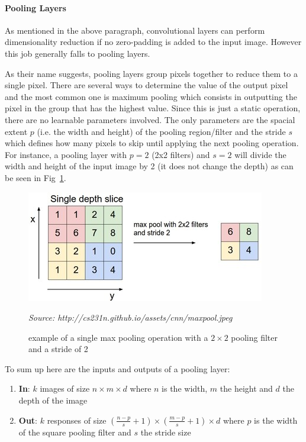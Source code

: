 \documentclass[12pt,twoside]{article}
\newcommand{\source}[1]{\vspace{-3pt} \caption*{ \footnotesize{\textit{Source: {#1}}}} }
\begin{document}
\paragraph{Pooling Layers}  

As mentioned in the above paragraph, convolutional layers can perform
dimensionality reduction if no zero-padding is added to the input image.
However this job generally falls to pooling layers.

As their name suggests, pooling layers group pixels together to reduce them to a
single pixel. There are several ways to determine the value of the output pixel
and the most common one is maximum pooling which consists in outputting the
pixel in the group that has the highest value. Since this is just a static
operation, there are no learnable parameters involved. The only parameters are
the spacial extent $p$ (i.e. the width and height) of the pooling region/filter and
the stride $s$ which defines how many pixels to skip until applying the next
pooling operation. For instance, a pooling layer with $p=2$ (2x2 filters) and
$s=2$ will divide the width and height of the input image by 2 (it does not
change the depth) as can be seen in Fig~\ref{fig:maxpool}.

\begin{figure}[ht]
  \centering
  \includegraphics[scale=0.7]{./figures/maxpool.jpeg}
  \caption{example of a single max pooling operation with a $2 \times 2$ pooling
  filter and a stride of 2}
  \source{http://cs231n.github.io/assets/cnn/maxpool.jpeg}
  \label{fig:maxpool}
\end{figure}

To sum up here are the inputs and outputs of a pooling layer:

\begin{enumerate}
  \item \textbf{In}: $k$ images of size $n \times m \times d$ where $n$ is the
    width, $m$ the height and $d$ the depth of the image
  \item \textbf{Out}: $k$ responses of size $\left( \frac{n-p}{s} + 1  \right)\times
    \left( \frac{m-p}{s}+1  \right)\times d$ where $p$ is the width of the
    square pooling filter and $s$ the stride size
\end{enumerate}
\end{document}
